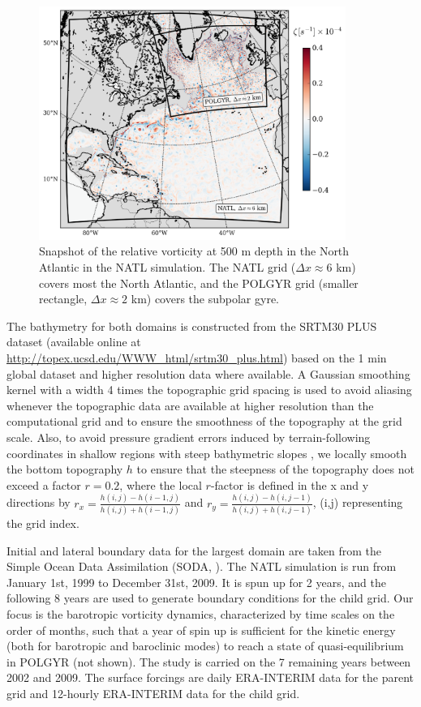 \documentclass[os, manuscript]{copernicus}
\begin{document}

\begin{figure}[t]
\includegraphics[width=10cm]{../fig_os/f01.pdf}
\caption{Snapshot of the relative vorticity at 500 m depth in the North Atlantic in the NATL simulation. The NATL grid ($\Delta x \approx 6$ km) covers most the North Atlantic, and the POLGYR grid (smaller rectangle, $\Delta x \approx 2$ km) covers the subpolar gyre.}
\label{f01}
\end{figure} 

The bathymetry for both domains is constructed from the SRTM30 PLUS dataset (available online at \url{http://topex.ucsd.edu/WWW_html/srtm30_plus.html}) based on the 1 min \cite{sandwell1997} global dataset and higher resolution data where available. A Gaussian smoothing kernel with a width 4 times the topographic grid spacing is used to avoid aliasing whenever the topographic data are available at higher resolution than the computational grid and to ensure the smoothness of the topography at the grid scale. Also, to avoid pressure gradient errors induced by terrain-following coordinates in shallow regions with steep bathymetric slopes \citep{beckmann1993}, we locally smooth the bottom topography $h$ to ensure that the steepness of the topography does not exceed a factor $r=0.2$, where the local $r$-factor is defined in the x and y directions by $r_x = \frac{h(i,j)-h(i-1,j)}{h(i,j)+h(i-1,j)}$ and $r_y = \frac{h(i,j)-h(i,j-1)}{h(i,j)+h(i,j-1)}$,  (i,j) representing the grid index.

Initial and lateral boundary data for the largest domain are taken from the Simple Ocean Data Assimilation (SODA, \citet{carton2008}). The NATL simulation is run from January 1st, 1999 to December 31st, 2009. It is spun up for 2 years, and the following 8 years are used to generate boundary conditions for the child grid. Our focus is the barotropic vorticity dynamics, characterized by time scales on the order of months, such that a year of spin up is sufficient for the kinetic energy (both for barotropic and baroclinic modes) to reach a state of quasi-equilibrium in POLGYR (not shown). The study is carried on the 7 remaining years between 2002 and 2009. The surface forcings are daily ERA-INTERIM data for the parent grid and 12-hourly ERA-INTERIM data for the child grid.
\end{document}
